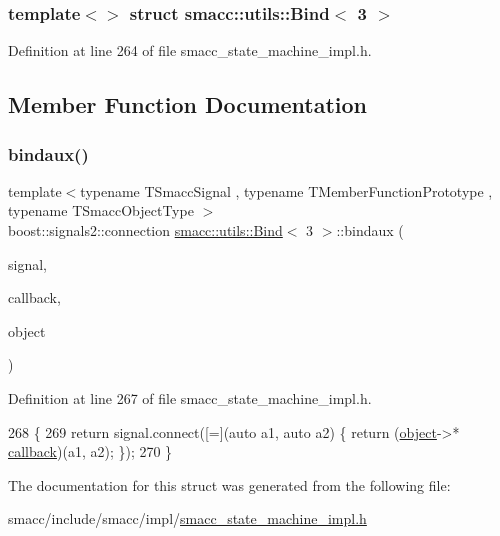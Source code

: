 \subsubsection*{template$<$$>$\newline
struct smacc\+::utils\+::\+Bind$<$ 3 $>$}



Definition at line 264 of file smacc\+\_\+state\+\_\+machine\+\_\+impl.\+h.



\subsection{Member Function Documentation}
\mbox{\label{structsmacc_1_1utils_1_1Bind_3_013_01_4_a8958f16a2a40b187e6500a76cfaeed63}} 
\subsubsection{\texorpdfstring{bindaux()}{bindaux()}}
{\footnotesize\ttfamily template$<$typename T\+Smacc\+Signal , typename T\+Member\+Function\+Prototype , typename T\+Smacc\+Object\+Type $>$ \\
boost\+::signals2\+::connection \hyperlink{structsmacc_1_1utils_1_1Bind}{smacc\+::utils\+::\+Bind}$<$ 3 $>$\+::bindaux (\begin{DoxyParamCaption}\item[{T\+Smacc\+Signal \&}]{signal,  }\item[{T\+Member\+Function\+Prototype}]{callback,  }\item[{T\+Smacc\+Object\+Type $\ast$}]{object }\end{DoxyParamCaption})\hspace{0.3cm}{\ttfamily [inline]}}



Definition at line 267 of file smacc\+\_\+state\+\_\+machine\+\_\+impl.\+h.


\begin{DoxyCode}
268   \{
269     \textcolor{keywordflow}{return} signal.connect([=](\textcolor{keyword}{auto} a1, \textcolor{keyword}{auto} a2) \{ \textcolor{keywordflow}{return} (\hyperlink{classobject}{object}->*
      \hyperlink{servers_2opencv__perception__node_2opencv__perception__node_8cpp_a050e697bd654facce10ea3f6549669b3}{callback})(a1, a2); \});
270   \}
\end{DoxyCode}


The documentation for this struct was generated from the following file\+:\begin{DoxyCompactItemize}
\item 
smacc/include/smacc/impl/\hyperlink{smacc__state__machine__impl_8h}{smacc\+\_\+state\+\_\+machine\+\_\+impl.\+h}\end{DoxyCompactItemize}
